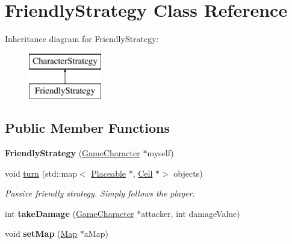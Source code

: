 \hypertarget{class_friendly_strategy}{}\section{Friendly\+Strategy Class Reference}
\label{class_friendly_strategy}
Inheritance diagram for Friendly\+Strategy\+:\begin{figure}[H]
\begin{center}
\leavevmode
\includegraphics[height=2.000000cm]{class_friendly_strategy}
\end{center}
\end{figure}
\subsection*{Public Member Functions}
\begin{DoxyCompactItemize}
\item 
\hypertarget{class_friendly_strategy_a9f2fb7e7ad9959d4504715ef56671afc}{}\label{class_friendly_strategy_a9f2fb7e7ad9959d4504715ef56671afc} 
{\bfseries Friendly\+Strategy} (\hyperlink{class_game_character}{Game\+Character} $\ast$myself)
\item 
\hypertarget{class_friendly_strategy_a372ce94bfd796d7d7577dbe64104bea4}{}\label{class_friendly_strategy_a372ce94bfd796d7d7577dbe64104bea4} 
void \hyperlink{class_friendly_strategy_a372ce94bfd796d7d7577dbe64104bea4}{turn} (std\+::map$<$ \hyperlink{class_placeable}{Placeable} $\ast$, \hyperlink{class_cell}{Cell} $\ast$$>$ objects)
\begin{DoxyCompactList}\small\item\em Passive friendly strategy. Simply follows the player. \end{DoxyCompactList}\item 
\hypertarget{class_friendly_strategy_a1e86c4d07ca276da00c227046787de45}{}\label{class_friendly_strategy_a1e86c4d07ca276da00c227046787de45} 
int {\bfseries take\+Damage} (\hyperlink{class_game_character}{Game\+Character} $\ast$attacker, int damage\+Value)
\item 
\hypertarget{class_friendly_strategy_a8c662e44fc07dc6a6121f46f4c8c251c}{}\label{class_friendly_strategy_a8c662e44fc07dc6a6121f46f4c8c251c} 
void {\bfseries set\+Map} (\hyperlink{class_map}{Map} $\ast$a\+Map)
\end{DoxyCompactItemize}
